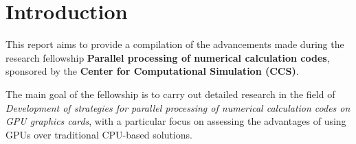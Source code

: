 \section{Introduction}

This report aims to provide a compilation of the advancements made during the research fellowship \textbf{Parallel processing of numerical calculation codes}, sponsored by the \textbf{Center for Computational Simulation (CCS)}.

The main goal of the fellowship is to carry out detailed research in the field of \textit{Development of strategies for parallel processing of numerical calculation codes on GPU graphics cards}, with a particular focus on assessing the advantages of using GPUs over traditional CPU-based solutions.



